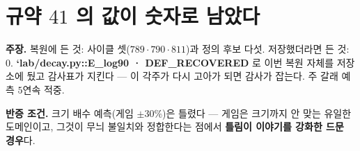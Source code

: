\documentclass[10pt,a4paper]{article}
\newcommand{\claim}[2]{\begin{claimbox}\textbf{주장.} #1\par\smallskip
  \textcolor{gray!70}{\textbf{반증 조건.} #2}\end{claimbox}}
\begin{document}
\section{규약 $41$ 의 값이 숫자로 남았다}

\claim{복원에 든 것: 사이클 셋($789 \cdot 790 \cdot 811$)과 정의 후보 다섯.
저장했더라면 든 것: $0$. \textbf{`lab/decay.py::E\_log90 · DEF\_RECOVERED} 로
이번 복원 자체를 저장소에 뒀고 감사표가 지킨다 --- 이 각주가 다시 고아가 되면
감사가 잡는다. 주 갈래 예측 $5$연속 적중.}
{크기 배수 예측(게임 $\pm 30\%$)은 틀렸다 --- 게임은 크기까지 안 맞는 유일한
도메인이고, 그것이 무늬 불일치와 정합한다는 점에서 \textbf{틀림이 이야기를
강화한 드문 경우}다.}
\end{document}
